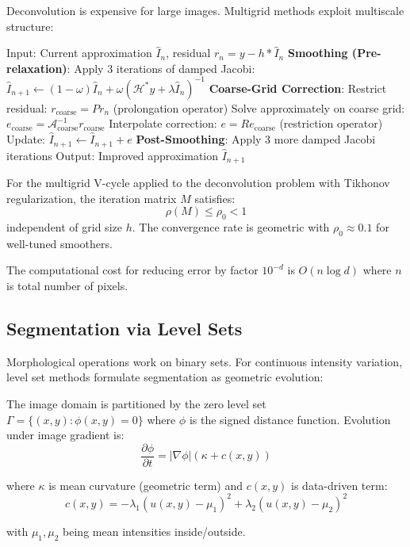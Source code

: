 \documentclass[twocolumn,11pt]{article}
\begin{document}
Deconvolution is expensive for large images. Multigrid methods exploit multiscale structure:

\begin{algorithm}
\caption{Multigrid V-Cycle for Deconvolution}
\begin{algorithmic}[1]
\State Input: Current approximation $\hat{I}_n$, residual $r_n = y - h * \hat{I}_n$
\State \textbf{Smoothing (Pre-relaxation)}:
  \State \quad Apply 3 iterations of damped Jacobi: $\hat{I}_{n+1} \leftarrow (1-\omega)\hat{I}_n + \omega (\mathcal{H}^* y + \lambda \hat{I}_n)^{-1}$
\State \textbf{Coarse-Grid Correction}:
  \State \quad Restrict residual: $r_{\text{coarse}} = P r_n$ (prolongation operator)
  \State \quad Solve approximately on coarse grid: $e_{\text{coarse}} = \mathcal{A}_{\text{coarse}}^{-1} r_{\text{coarse}}$
  \State \quad Interpolate correction: $e = R e_{\text{coarse}}$ (restriction operator)
  \State \quad Update: $\hat{I}_{n+1} \leftarrow \hat{I}_{n+1} + e$
\State \textbf{Post-Smoothing}:
  \State \quad Apply 3 more damped Jacobi iterations
\State Output: Improved approximation $\hat{I}_{n+1}$
\end{algorithmic}
\end{algorithm}

\begin{theorem}
For the multigrid V-cycle applied to the deconvolution problem with Tikhonov regularization, the iteration matrix $M$ satisfies:
\begin{equation}
\rho(M) \leq \rho_0 < 1
\end{equation}
independent of grid size $h$. The convergence rate is geometric with $\rho_0 \approx 0.1$ for well-tuned smoothers.

The computational cost for reducing error by factor $10^{-d}$ is $O(n \log d)$ where $n$ is total number of pixels.
\end{theorem}

\subsection{Segmentation via Level Sets}

Morphological operations work on binary sets. For continuous intensity variation, level set methods formulate segmentation as geometric evolution:

\begin{definition}
The image domain is partitioned by the zero level set $\Gamma = \{(x,y) : \phi(x,y) = 0\}$ where $\phi$ is the signed distance function. Evolution under image gradient is:
\begin{equation}
\frac{\partial \phi}{\partial t} = |\nabla \phi| \left( \kappa + c(x,y) \right)
\end{equation}

where $\kappa$ is mean curvature (geometric term) and $c(x,y)$ is data-driven term:
\begin{equation}
c(x,y) = -\lambda_1 (u(x,y) - \mu_1)^2 + \lambda_2 (u(x,y) - \mu_2)^2
\end{equation}

with $\mu_1, \mu_2$ being mean intensities inside/outside.
\end{definition}
\end{document}
